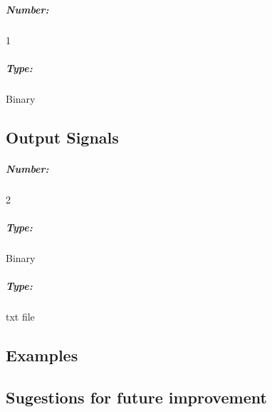 \subparagraph*{Number:} 1

\subparagraph*{Type:} Binary

\subsection*{Output Signals}

\subparagraph*{Number:} 2

\subparagraph*{Type:} Binary
\subparagraph*{Type:} txt file

\subsection*{Examples}



\subsection*{Sugestions for future improvement}



